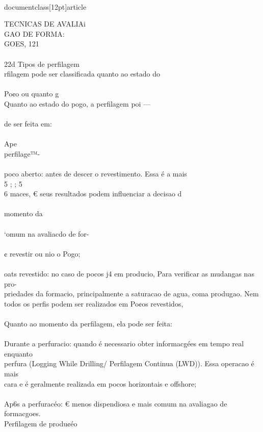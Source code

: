 \\documentclass[12pt]{article}
\begin{document}
TECNICAS DE AVALIAi\\
GAO DE FORMA:\\
GOES, 121\\
\\
22d Tipos de perfilagem\\
rfilagem pode ser classificada quanto ao estado do\\
\\
Po¢o ou quanto g\\
Quanto ao estado do pogo, a perfilagem poi —\\
\\
de ser feita em:\\
\\
Ape\\
perfilage™-\\
\\
poco aberto: antes de descer o revestimento. Essa é a mais\\
5 ; ; 5\\
6 maces, € seus resultados podem influenciar a decisao d\\
\\
momento da\\
\\
‘omum na avaliacdo de for-\\
\\
¢ revestir ou nio o Pogo;\\
\\
oats revestido: no caso de pocos j4 em producio, Para verificar as mudangas nas pro-\\
priedades da formacio, principalmente a saturacao de agua, coma produgao. Nem\\
todos os perfis podem ser realizados em Po¢os revestidos,\\
\\
Quanto ao momento da perfilagem, ela pode ser feita:\\
\\
Durante a perfuracio: quando é necessario obter informacgées em tempo real enquanto\\
perfura (Logging While Drilling/ Perfilagem Continua (LWD)). Essa operacao é mais\\
cara e é geralmente realizada em pocos horizontais e offshore;\\
\\
Ap6s a perfuracéo: € menos dispendiosa e mais comum na avaliagao de formacgoes.\\
Perfilagem de produ¢éo\\
\\
\end{document}
